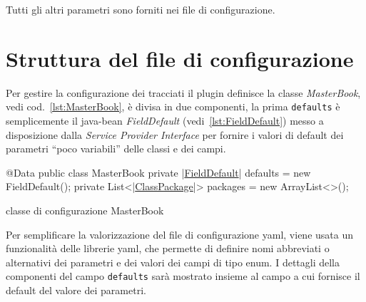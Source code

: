 \documentclass[a4paper,10pt]{report}
\newif\ifesource
\newenvironment{elisting}[1][H]
  {\captionsetup{aboveskip=0pt}\begin{listing}[#1]}
  {\end{listing}%
}
\begin{document}
Tutti gli altri parametri sono forniti nei file di configurazione.

\section{Struttura del file di configurazione}
Per gestire la configurazione dei tracciati il plugin definisce la classe
\textsl{MasterBook}, vedi cod.~\ref{lst:MasterBook}, è divisa in due componenti,
la prima \texttt{defaults} è semplicemente il java-bean \textsl{FieldDefault}
(vedi~\ref{lst:FieldDefault}) messo a disposizione dalla 
\textsl{Service Provider Interface} per fornire i valori di default dei 
parametri ``poco variabili'' delle classi e dei campi.

\ifesource
\begin{figure*}[!htb]
\begin{lstlisting}[language=java, caption=classe di configurazione MasterBook, 
label=lst:MasterBook]
@Data
public class MasterBook {
    private (*\hyperref[lst:FieldDefault]{FieldDefault}*) defaults = new FieldDefault();
    private List<(*\hyperref[lst:ClassPackage]{ClassPackage}*)> packages = new ArrayList<>();
}
\end{lstlisting}
\end{figure*}
\else
\begin{elisting}[!htb]
\begin{javacode}
@Data
public class MasterBook {
    private |\hyperref[lst:FieldDefault]{FieldDefault}| defaults = new FieldDefault();
    private List<|\hyperref[lst:ClassPackage]{ClassPackage}|> packages = new ArrayList<>();
}
\end{javacode}
\caption{classe di configurazione MasterBook}
\label{lst:MasterBook}
\end{elisting}
\fi

Per semplificare la valorizzazione del file di configurazione yaml, viene usata
un funzionalità delle librerie yaml, che permette di definire nomi abbreviati o
alternativi dei parametri e dei valori dei campi di tipo enum.
I dettagli della componenti del campo \texttt{defaults} sarà mostrato insieme al
campo a cui fornisce il default del valore dei parametri.

\end{document}
